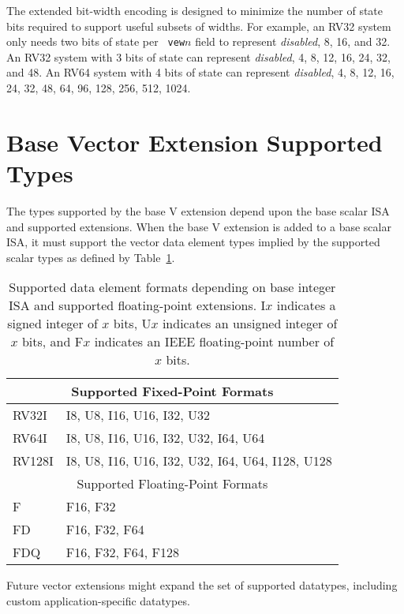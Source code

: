 \begin{commentary}
    The extended bit-width encoding is designed to minimize the number
    of state bits required to support useful subsets of widths. For
    example, an RV32 system only needs two bits of state per {\tt
      vew}$n$ field to represent {\em disabled}, 8, 16, and 32. An
    RV32 system with 3 bits of state can represent {\em disabled}, 4,
    8, 12, 16, 24, 32, and 48.  An RV64 system with 4 bits of state
    can represent {\em disabled}, 4, 8, 12, 16, 24, 32, 48, 64, 96,
    128, 256, 512, 1024.
\end{commentary}

\clearpage

\section{Base Vector Extension Supported Types}

The types supported by the base V extension depend upon the base
scalar ISA and supported extensions.  When the base V extension is
added to a base scalar ISA, it must support the vector data element
types implied by the supported scalar types as defined by
Table~\ref{tab:velemtypes}.

\begin{table}[hbt]
  \centering
\begin{tabular}{|l|l|}
  \hline
  \multicolumn{2}{|c|}{Supported Fixed-Point Formats} \\
  \hline
  RV32I  & I8, U8, I16, U16, I32, U32 \\
  RV64I  & I8, U8, I16, U16, I32, U32, I64, U64 \\
  RV128I & I8, U8, I16, U16, I32, U32, I64, U64, I128, U128 \\
  \hline
  \hline
  \multicolumn{2}{|c|}{Supported Floating-Point Formats} \\
  \hline
  F      & F16, F32 \\
  FD     & F16, F32, F64 \\
  FDQ    & F16, F32, F64, F128 \\
  \hline
\end{tabular}
\caption{Supported data element formats depending on base integer ISA
  and supported floating-point extensions.  I$x$ indicates a signed
  integer of $x$ bits, U$x$ indicates an unsigned integer of $x$ bits,
  and F$x$ indicates an IEEE floating-point number of $x$ bits.}
\label{tab:velemtypes}
\end{table}

\begin{commentary}
  Future vector extensions might expand the set of supported
  datatypes, including custom application-specific datatypes.
\end{commentary}

